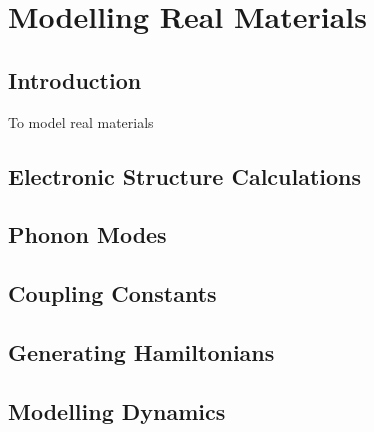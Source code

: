 
\chapter{Modelling Real Materials} %

\label{Chapter5} %


\section{Introduction}

To model real materials

\section{Electronic Structure Calculations}

\section{Phonon Modes}

\section{Coupling Constants}

\section{Generating Hamiltonians}

\section{Modelling Dynamics}

